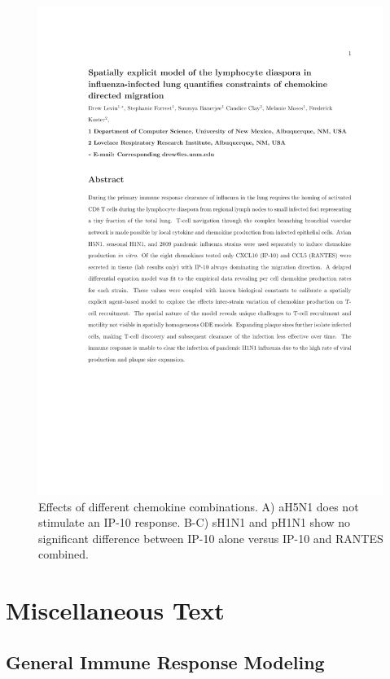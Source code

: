 \documentclass[10pt]{article}
\begin{document}
\begin{figure}[ht!]
\begin{center}
	\includegraphics[width=\textwidth]{chemokine}
	\caption{Effects of different chemokine combinations.  A) aH5N1 does not stimulate an IP-10 response.  B-C) sH1N1 and pH1N1 show no significant difference between IP-10 alone versus IP-10 and RANTES combined.}
	\label{fig:chemokine}
\end{center}
\end{figure}



\section*{Miscellaneous Text}

\subsection*{General Immune Response Modeling}
\end{document}
